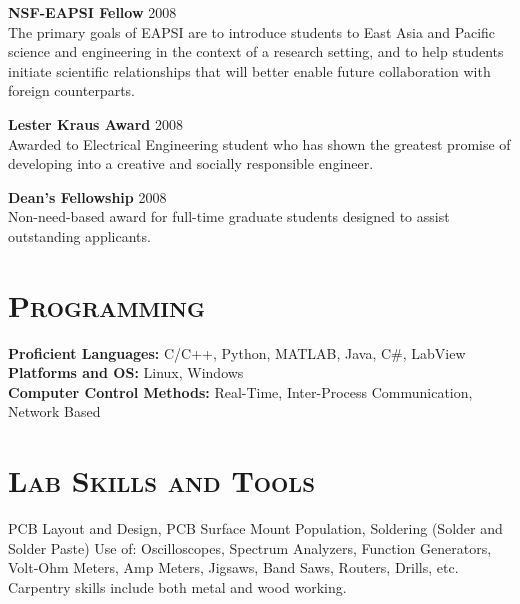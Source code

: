 \begin{resume}
\textbf{NSF-EAPSI Fellow} \hfill 2008 \\
The primary goals of EAPSI are to introduce students to East Asia and Pacific science and engineering in the context of a research setting, and to help students initiate scientific relationships that will better enable future collaboration with foreign counterparts.
\newline

\textbf{Lester Kraus Award} \hfill 2008 \\ 
Awarded to Electrical Engineering student who has shown the greatest promise of developing into a creative and socially responsible engineer.
\newline

\textbf{Dean's Fellowship} \hfill 2008 \\ 
Non-need-based award for full-time graduate students designed to assist outstanding applicants.


\section{\textsc{Programming}}
\textbf{Proficient Languages:} C/C++, Python, MATLAB, Java,  C\#, LabView\\
\textbf{Platforms and OS:} Linux, Windows\\
\textbf{Computer Control Methods:} Real-Time, Inter-Process Communication, Network Based

\section{\textsc{Lab Skills and Tools}}
PCB Layout and Design, PCB Surface Mount Population, Soldering (Solder and Solder Paste) Use of: Oscilloscopes, Spectrum Analyzers, Function Generators, Volt-Ohm Meters, Amp Meters, Jigsaws, Band Saws, Routers, Drills, etc.  Carpentry skills include both metal and wood working.


\begin{formatb}
  \\
  \body\\
\end{formatb}


\end{resume}
